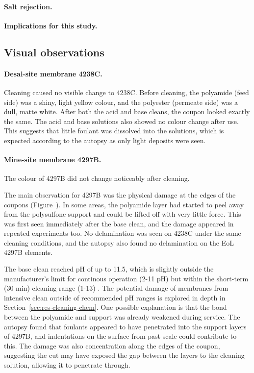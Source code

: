 \paragraph{Salt rejection.} 

\paragraph{Implications for this study.} 



\subsection{Visual observations}
\paragraph{Desal-site membrane 4238C. } 
Cleaning caused no visible change to 4238C. Before cleaning, the polyamide (feed side) was a shiny, light yellow colour, and the polyester (permeate side) was a dull, matte white. After both the acid and base cleans, the coupon looked exactly the same. The acid and base solutions also showed no colour change after use. This suggests that little foulant was dissolved into the solutions, which is expected according to the autopsy as only light deposits were seen.

\paragraph{Mine-site membrane 4297B. }
The colour of 4297B did not change noticeably after cleaning. 

The main observation for 4297B was the physical damage at the edges of the coupons (Figure~). In some areas, the polyamide layer had started to peel away from the polysulfone support and could be lifted off with very little force. This was first seen immediately after the base clean, and the damage appeared in repeated experiments too. No delamination was seen on 4238C under the same cleaning conditions, and the autopsy also found no delamination on the EoL 4297B elements. 

The base clean reached pH of up to 11.5, which is slightly outside the manufacturer's limit for continous operation (2-11 pH) but within the short-term (30 min) cleaning range (1-13) \citep{MembraneWorks2026Mine}. The potential damage of membranes from intensive clean outside of recommended pH ranges is explored in depth in Section~\ref{sec:res-cleaning-chem}. One possible explanation is that the bond between the polyamide and support was already weakened during service. The autopsy found that foulants appeared to have penetrated into the support layers of 4297B, and indentations on the surface from past scale could contribute to this. The damage was also concentration along the edges of the coupon, suggesting the cut may have exposed the gap between the layers to the cleaning solution, allowing it to penetrate through. 

